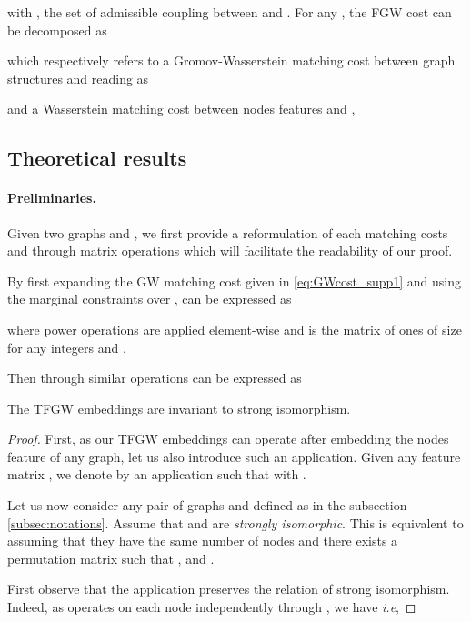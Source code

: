 \documentclass{article}
\begin{document}
{with , the set of admissible coupling between  and
. For any , the FGW cost  can be decomposed as 

which respectively refers to a Gromov-Wasserstein matching cost  between graph structures  and  reading as

and a Wasserstein matching cost  between nodes features  and ,

\subsection{Theoretical results}

\paragraph{Preliminaries.} 
Given two graphs  and , we first provide a reformulation of each matching costs  and  through matrix operations which will facilitate the readability of our proof. 

By first expanding the GW matching cost given in \ref{eq:GWcost_supp1} and using the marginal constraints over ,  can be expressed as 

where power operations are applied element-wise and  is the matrix of ones of size  for any integers  and . 

Then through similar operations  can be expressed as

\setcounter{lemma}{0}
\begin{lemma}
	The TFGW embeddings are invariant to strong isomorphism.
\end{lemma}
\begin{proof}

First, as our TFGW embeddings can operate after embedding the nodes feature of any graph, let us also introduce such an application. Given any feature matrix , we denote by  an application such that  with .

Let us now consider any pair of graphs  and  defined as in the subsection \ref{subsec:notations}. Assume that  and  are \emph{strongly isomorphic}. This is equivalent to assuming that they have the same number of nodes  and there exists a permutation matrix  such that ,  and  \cite{titouan2019optimal,chowdhury-gromov-wasserstein-2019}.





First observe that the application  preserves the relation of strong isomorphism. Indeed, as  operates on each node independently through , we have  \emph{i.e},


\end{proof}}
\end{document}
